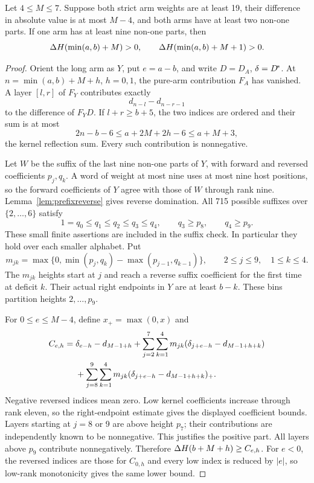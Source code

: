 \begin{theorem}\label{thm:central}
Let $4\le M\le7$. Suppose both strict arm weights are at least 19, their difference in absolute value is at most $M-4$, and both arms have at least two non-one parts. If one arm has at least nine non-one parts, then
\[
 \Delta H(\min(a,b)+M)>0,\qquad \Delta H(\min(a,b)+M+1)>0.
\]
\end{theorem}
\begin{proof}
Orient the long arm as $Y$, put $e=a-b$, and write $D=D_A$, $\delta=D^{\!*}$. At $n=\min(a,b)+M+h$, $h=0,1$, the pure-arm contribution $F_A$ has vanished. A layer $[l,r]$ of $F_Y$ contributes exactly
\[
 d_{n-l}-d_{n-r-1}
\]
to the difference of $F_YD$. If $l+r\ge b+5$, the two indices are ordered and their sum is at most
\[
 2n-b-6\le a+2M+2h-6\le a+M+3,
\]
the kernel reflection sum. Every such contribution is nonnegative.

Let $W$ be the suffix of the last nine non-one parts of $Y$, with forward and reversed coefficients $p_j,q_k$. A word of weight at most nine uses at most nine host positions, so the forward coefficients of $Y$ agree with those of $W$ through rank nine. Lemma~\ref{lem:prefixreverse} gives reverse domination. All 715 possible suffixes over $\{2,\ldots,6\}$ satisfy
\[
 1=q_0\le q_1\le q_2\le q_3\le q_4,
 \qquad q_3\ge p_8,\qquad q_4\ge p_9.
\]
These small finite assertions are included in the suffix check. In particular they hold over each smaller alphabet. Put
\begin{equation}\label{eq:bins}
 m_{jk}=\max\{0,\min(p_j,q_k)-\max(p_{j-1},q_{k-1})\},
 \qquad 2\le j\le9,\quad1\le k\le4.
\end{equation}
The $m_{jk}$ heights start at $j$ and reach a reverse suffix coefficient for the first time at deficit $k$. Their actual right endpoints in $Y$ are at least $b-k$. These bins partition heights $2,\ldots,p_9$.

For $0\le e\le M-4$, define $x_+=\max(0,x)$ and
\begin{align}\label{eq:budgetcentral}
 C_{e,h}={}&\delta_{e-h}-d_{M-1+h}
 +\sum_{j=2}^{7}\sum_{k=1}^{4}m_{jk}(\delta_{j+e-h}-d_{M-1+h+k})\notag\\
 &+\sum_{j=8}^{9}\sum_{k=1}^{4}m_{jk}
                   (\delta_{j+e-h}-d_{M-1+h+k})_+.
\end{align}
Negative reversed indices mean zero. Low kernel coefficients increase through rank eleven, so the right-endpoint estimate gives the displayed coefficient bounds. Layers starting at $j=8$ or 9 are above height $p_7$; their contributions are independently known to be nonnegative. This justifies the positive part. All layers above $p_9$ contribute nonnegatively. Therefore $\Delta H(b+M+h)\ge C_{e,h}$. For $e<0$, the reversed indices are those for $C_{0,h}$ and every low index is reduced by $|e|$, so low-rank monotonicity gives the same lower bound.


\end{proof}
